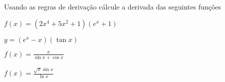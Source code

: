 \documentclass[12pt]{exam}
\begin{document}
\begin{questions}
\question Usando as regras de derivação cálcule a derivada das seguintes funções


\begin{enumerate}[(a)]
    \begin{multicols}{2}
                \item $\displaystyle f(x) = \left( 2x^4 + 5x^2 + 1\right)\left( e^x+ 1\right) $
                \item $\displaystyle y = \left( e^x - x\right) \left( \tan{x}\right)$
                \item $\displaystyle  f(x) = \frac{x}{\sin{x} + \cos{x}} $
                \item $\displaystyle f(x) = \frac{\sqrt{x}\sin{x}}{\ln{x}} $
    \end{multicols}
\end{enumerate}

\end{questions}
\end{document}
